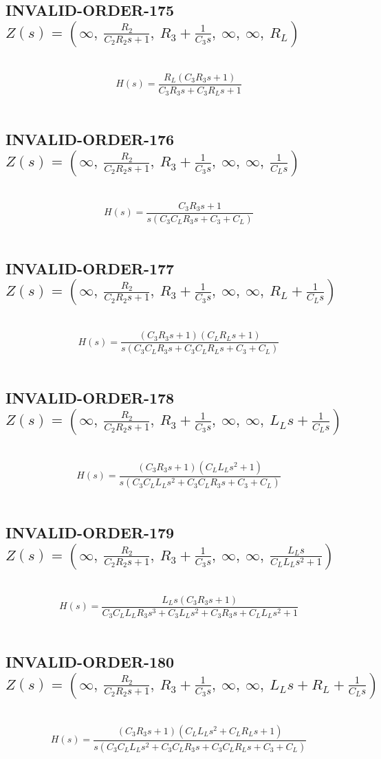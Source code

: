 \documentclass{article}
\begin{document}
\subsection{INVALID-ORDER-175 $Z(s) = \left( \infty, \  \frac{R_{2}}{C_{2} R_{2} s + 1}, \  R_{3} + \frac{1}{C_{3} s}, \  \infty, \  \infty, \  R_{L}\right)$ } \ 
\textbf{\[H(s) = \frac{R_{L} \left(C_{3} R_{3} s + 1\right)}{C_{3} R_{3} s + C_{3} R_{L} s + 1}\] } \ 
\subsection{INVALID-ORDER-176 $Z(s) = \left( \infty, \  \frac{R_{2}}{C_{2} R_{2} s + 1}, \  R_{3} + \frac{1}{C_{3} s}, \  \infty, \  \infty, \  \frac{1}{C_{L} s}\right)$ } \ 
\textbf{\[H(s) = \frac{C_{3} R_{3} s + 1}{s \left(C_{3} C_{L} R_{3} s + C_{3} + C_{L}\right)}\] } \ 
\subsection{INVALID-ORDER-177 $Z(s) = \left( \infty, \  \frac{R_{2}}{C_{2} R_{2} s + 1}, \  R_{3} + \frac{1}{C_{3} s}, \  \infty, \  \infty, \  R_{L} + \frac{1}{C_{L} s}\right)$ } \ 
\textbf{\[H(s) = \frac{\left(C_{3} R_{3} s + 1\right) \left(C_{L} R_{L} s + 1\right)}{s \left(C_{3} C_{L} R_{3} s + C_{3} C_{L} R_{L} s + C_{3} + C_{L}\right)}\] } \ 
\subsection{INVALID-ORDER-178 $Z(s) = \left( \infty, \  \frac{R_{2}}{C_{2} R_{2} s + 1}, \  R_{3} + \frac{1}{C_{3} s}, \  \infty, \  \infty, \  L_{L} s + \frac{1}{C_{L} s}\right)$ } \ 
\textbf{\[H(s) = \frac{\left(C_{3} R_{3} s + 1\right) \left(C_{L} L_{L} s^{2} + 1\right)}{s \left(C_{3} C_{L} L_{L} s^{2} + C_{3} C_{L} R_{3} s + C_{3} + C_{L}\right)}\] } \ 
\subsection{INVALID-ORDER-179 $Z(s) = \left( \infty, \  \frac{R_{2}}{C_{2} R_{2} s + 1}, \  R_{3} + \frac{1}{C_{3} s}, \  \infty, \  \infty, \  \frac{L_{L} s}{C_{L} L_{L} s^{2} + 1}\right)$ } \ 
\textbf{\[H(s) = \frac{L_{L} s \left(C_{3} R_{3} s + 1\right)}{C_{3} C_{L} L_{L} R_{3} s^{3} + C_{3} L_{L} s^{2} + C_{3} R_{3} s + C_{L} L_{L} s^{2} + 1}\] } \ 
\subsection{INVALID-ORDER-180 $Z(s) = \left( \infty, \  \frac{R_{2}}{C_{2} R_{2} s + 1}, \  R_{3} + \frac{1}{C_{3} s}, \  \infty, \  \infty, \  L_{L} s + R_{L} + \frac{1}{C_{L} s}\right)$ } \ 
\textbf{\[H(s) = \frac{\left(C_{3} R_{3} s + 1\right) \left(C_{L} L_{L} s^{2} + C_{L} R_{L} s + 1\right)}{s \left(C_{3} C_{L} L_{L} s^{2} + C_{3} C_{L} R_{3} s + C_{3} C_{L} R_{L} s + C_{3} + C_{L}\right)}\] } \ 
\end{document}
